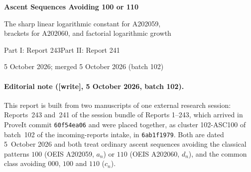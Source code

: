 \documentclass[11pt,letterpaper]{article}
\newcommand{\PartMark}[1]{\InsertMark{a59part}{#1}}
\theoremstyle{remark}\newtheorem{remark}[theorem]{Remark}
\newcommand{\wtag}{\textup{[write]}}
\theoremstyle{remark}\newtheorem{wremark}{Remark}\renewcommand{\thewremark}{W\arabic{wremark}}
\theoremstyle{plain}\newtheorem{wcorollary}[wremark]{Corollary}
\begin{document}
\PartMark{a202059-ascent-100-110-growth}%
\begin{center}
{\LARGE\bfseries Ascent Sequences Avoiding 100 or 110}\par\vspace{8pt}
{\large The sharp linear logarithmic constant for A202059,\\ brackets for A202060, and factorial logarithmic growth}\par\vspace{8pt}
{\normalsize Part I: Report 243\quad Part II: Report 241}\par\vspace{5pt}
5 October 2026; merged 5 October 2026 (batch 102)
\end{center}
\begin{abstract}
Let $a_n$ count ordinary ascent sequences avoiding the arbitrary-subsequence pattern $100$, and let $e_n$ count those avoiding both $000$ and $100$. For either $u_n=a_n$ or $u_n=e_n$, we prove
\[
 \log u_n=n\bigl(\log n-2\log\log n+\log2-1\bigr)
       +O\!\left(\frac{n(\log\log n)^2}{\log n}\right).
\]
Consequently $(\log n)^2(u_n/n!)^{1/n}\to2$. The upper comparison refines an earlier marked-occurrence encoding by retaining the exact increasing-run index. The lower comparison converts triangular weak compositions into positive-block words, repairing empty rows and explicitly bounding three many-to-one fibers. An elementary localization proof supplies the required logarithmic estimate for the historically known triangular sum. A doubled seed gives normalized-root liminf at least $1/2$ for $110$ avoidance and for simultaneous $000,100,110$ avoidance; both have limsup at most $2$. We also prove two-term first-crossing inverses, with a bracket rather than a determined second coefficient for these latter classes. No relative counting equivalent or existence of their linear logarithmic constants is claimed.
\end{abstract}

\paragraph{Editorial note (\wtag, 5 October 2026, batch 102).}
This report is built from two manuscripts of one external research
session: Reports~243 and~241 of the session bundle of Reports 1--243,
which arrived in ProveIt commit \texttt{60f54ea06} and were placed together,
as cluster 102-ASC100 of batch~102 of the incoming-reports intake, in
\texttt{6ab1f1979}. Both are dated 5~October 2026 and both treat ordinary
ascent sequences avoiding the classical patterns $100$ (OEIS A202059,
$a_n$) or $110$ (OEIS A202060, $d_n$), and the common class avoiding
$000$, $100$ and $110$ ($c_n$).
\end{document}
